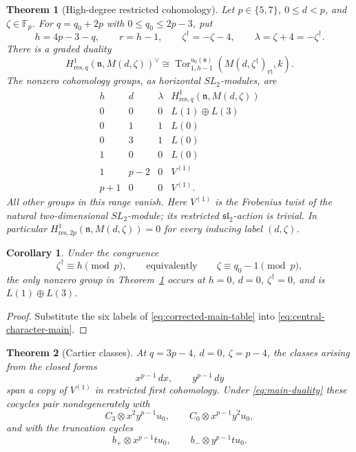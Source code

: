 \documentclass[11pt]{article}
\theoremstyle{plain}
\newtheorem{theorem}{Theorem}[section]
\newtheorem{corollary}[corollary]{Corollary}
\theoremstyle{definition}
\theoremstyle{remark}
\numberwithin{equation}{section}
\newcommand{\kk}{k}
\newcommand{\slie}{\mathfrak{sl}_2}
\newcommand{\Tor}{\operatorname{Tor}}
\newcommand{\uenv}{\mathrm u}
\begin{document}
\begin{theorem}[High-degree restricted cohomology]\label{thm:main}
Let $p\in\{5,7\}$, $0\le d<p$, and $\zeta\in\mathbb F_p$.
For $q=q_0+2p$ with $0\le q_0\le2p-3$, put
\[
 h=4p-3-q,\qquad r=h-1,\qquad
 \zeta^\dagger=-\zeta-4,\qquad \lambda=\zeta+4=-\zeta^\dagger.
\]
There is a graded duality
\begin{equation}\label{eq:main-duality}
 H^1_{\mathrm{res},q}(\mathfrak n,M(d,\zeta))^\vee
 \cong
 \Tor^{\uenv_0(\mathfrak n)}_{1,h-1}
       (M(d,\zeta^\dagger)_{\mathrm{rt}},\kk).
\end{equation}
The nonzero cohomology groups, as horizontal $SL_2$-modules, are
\begin{equation}\label{eq:corrected-main-table}
\begin{array}{c|c|c|c}
 h&d&\lambda&H^1_{\mathrm{res},q}(\mathfrak n,M(d,\zeta))\\ \hline
 0&0&0&L(1)\oplus L(3)\\
 0&1&1&L(0)\\
 0&3&1&L(0)\\
 1&0&0&L(0)\\
 1&p-2&0&V^{(1)}\\
 p+1&0&0&V^{(1)}.
\end{array}
\end{equation}
All other groups in this range vanish.
Here $V^{(1)}$ is the Frobenius twist of the natural two-dimensional
$SL_2$-module; its restricted $\slie$-action is trivial.
In particular $H^1_{\mathrm{res},2p}(\mathfrak n,M(d,\zeta))=0$
for every inducing label $(d,\zeta)$.
\end{theorem}

\begin{corollary}\label{cor:congruence-row}
Under the congruence
\begin{equation}\label{eq:central-character-main}
 \zeta^\dagger\equiv h\pmod p,
 \qquad\text{equivalently}\qquad\zeta\equiv q_0-1\pmod p,
\end{equation}
the only nonzero group in Theorem~\ref{thm:main} occurs at
$h=0$, $d=0$, $\zeta^\dagger=0$, and is $L(1)\oplus L(3)$.
\end{corollary}
\begin{proof}
Substitute the six labels of \eqref{eq:corrected-main-table} into
\eqref{eq:central-character-main}.
\end{proof}

\begin{theorem}[Cartier classes]\label{thm:qtop}
At $q=3p-4$, $d=0$, $\zeta=p-4$, the classes arising from the closed forms
\[
 x^{p-1}\,dx,\qquad y^{p-1}\,dy
\]
span a copy of $V^{(1)}$ in restricted first cohomology.
Under \eqref{eq:main-duality} these cocycles pair nondegenerately with
\[
 C_3\otimes x^2y^{p-1}u_0,\qquad
 C_0\otimes x^{p-1}y^2u_0,
\]
and with the truncation cycles
\[
 b_+\otimes x^{p-1}tu_0,\qquad
 b_-\otimes y^{p-1}tu_0.
\]
\end{theorem}
\end{document}
